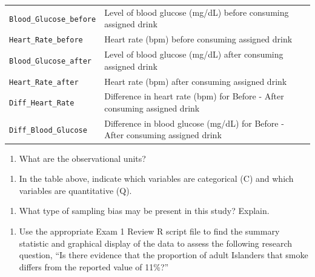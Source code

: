 \documentclass[
]{report}
\providecommand{\tightlist}{%
  \setlength{\itemsep}{0pt}\setlength{\parskip}{0pt}}
\begin{document}
{\begin{longtable}[]{@{}
  >{\raggedright\arraybackslash}p{}
  >{\raggedright\arraybackslash}p{}@{}}
\texttt{Blood\_Glucose\_before} & Level of blood glucose (mg/dL) before consuming assigned drink \\
\texttt{Heart\_Rate\_before} & Heart rate (bpm) before consuming assigned drink \\
\texttt{Blood\_Glucose\_after} & Level of blood glucose (mg/dL) after consuming assigned drink \\
\texttt{Heart\_Rate\_after} & Heart rate (bpm) after consuming assigned drink \\
\texttt{Diff\_Heart\_Rate} & Difference in heart rate (bpm) for Before - After consuming assigned drink \\
\texttt{Diff\_Blood\_Glucose} & Difference in blood glucose (mg/dL) for Before - After consuming assigned drink \\
\end{longtable}
}

\begin{enumerate}
\def\labelenumi{\arabic{enumi}.}
\tightlist
\item
  What are the observational units?
\end{enumerate}

\vspace{0.2in}

\begin{enumerate}
\def\labelenumi{\arabic{enumi}.}
\setcounter{enumi}{1}
\tightlist
\item
  In the table above, indicate which variables are categorical (C) and which variables are quantitative (Q).
\end{enumerate}

\vspace{0.1in}

\begin{enumerate}
\def\labelenumi{\arabic{enumi}.}
\setcounter{enumi}{2}
\tightlist
\item
  What type of sampling bias may be present in this study? Explain.
\end{enumerate}

\vspace{0.6in}

\newpage

\begin{enumerate}
\def\labelenumi{\arabic{enumi}.}
\setcounter{enumi}{3}
\tightlist
\item
  Use the appropriate Exam 1 Review R script file to find the summary statistic and graphical display of the data to assess the following research question, ``Is there evidence that the proportion of adult Islanders that smoke differs from the reported value of 11\%?''
\end{enumerate}
\end{document}
